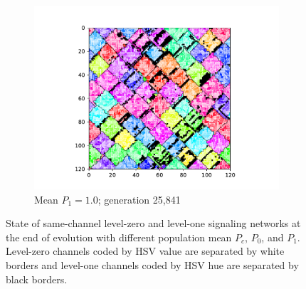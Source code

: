 \begin{figure}[!htbp]
\begin{center}
\begin{subfigure}[b]{0.82\columnwidth}
  \includegraphics[width=\columnwidth,trim={2.5cm 0.5cm 2.5cm 1cm},clip]{img/ChannelMap_1008_update19500000}
  \caption{Mean $P_1 = 1.0$; generation 25,841}
  \label{fig:ChannelMap_1008}
\end{subfigure}

\caption{
State of same-channel level-zero and level-one signaling networks at the end of evolution with different population mean $P_{c}$, $P_0$, and $P_1$.
Level-zero channels coded by HSV value are separated by white borders and level-one channels coded by HSV hue are separated by black borders.
}
\label{fig:outcome_grids}
\end{center}
\end{figure}
